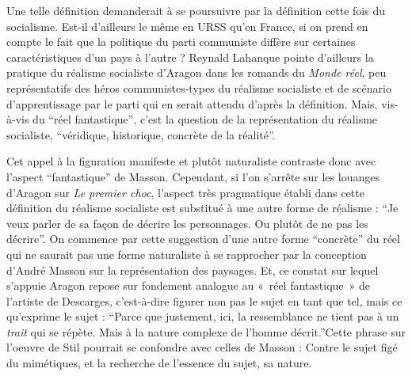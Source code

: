 	 Une telle définition demanderait à se poursuivre par la définition cette fois du socialisme. Est-il d’ailleurs le même en URSS qu’en France, si on prend en compte le fait que la politique du parti communiste diffère sur certaines caractéristiques d’un pays à l’autre ? Reynald Lahanque pointe d’ailleurs la pratique du réalisme socialiste d’Aragon dans les romands du \emph{Monde réel}, peu représentatifs des héros communistes-types du réalisme socialiste et de scénario d’apprentissage par le parti qui en serait attendu d’après la définition. Mais, vis-à-vis du \enquote{réel fantastique}, c’est la question de la représentation du réalisme socialiste, \enquote{véridique, historique, concrète de la réalité}.

 Cet appel à la figuration manifeste et plutôt naturaliste contraste donc avec l’aspect \enquote{fantastique} de Masson. Cependant, si l’on s’arrête sur les louanges d’Aragon sur \emph{Le premier choc}, l’aspect très pragmatique établi dans cette définition du réalisme socialiste est substitué à une autre forme de réalisme : \enquote{Je veux parler de sa façon de décrire les personnages. Ou plutôt de ne pas les décrire}. On commence par cette suggestion d’une autre forme \enquote{concrète} du réel qui ne saurait pas une forme naturaliste à se rapprocher par la conception d’André Masson sur la représentation des paysages. Et, ce constat sur lequel s’appuie Aragon repose sur fondement analogue au « réel fantastique » de l’artiste de Descarges, c’est-à-dire figurer non pas le sujet en tant que tel, mais ce qu’exprime le sujet : \enquote{Parce que justement, ici, la ressemblance ne tient  pas à un \emph{trait} qui se répète. Mais à la nature complexe de l’homme décrit.}Cette phrase sur l’oeuvre de Stil pourrait se confondre avec celles de Masson : Contre le sujet figé du mimétiques, et la recherche de l’essence du sujet, sa nature. 

